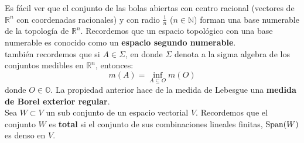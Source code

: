 \documentclass[12pt]{book}
\numberwithin{equation}{chapter}
\def\R{\mathbb{R}}
\begin{document}
Es f\'acil ver que el conjunto de las bolas abiertas con centro racional (vectores de $\R^{n}$ con coordenadas racionales) y con radio $\frac{1}{n}$ ($n \in \mathbb{N}$) forman una base numerable de la topolog\'ia de $\R^{n}$. Recordemos que un espacio topol\'ogico con una base numerable es conocido como un {\bf espacio segundo numerable}. \\
tambi\'en recordemos que si $A \in \Sigma$, en donde $\Sigma$ denota a la sigma algebra de los conjuntos medibles en $\R^{n}$, entonces:
$$ m(A)= \inf_{A \subseteq O} m(O) $$
donde $O \in \mathbb{O} $. La propiedad anterior hace de la medida de Lebesgue una {\bf medida de Borel exterior regular}.\\
Sea $W \subset V$ un sub conjunto de un espacio vectorial $V$. Recordemos que el conjunto $W$ es {\bf total} si el conjunto de sus combinaciones lineales finitas, $\hbox{Span}(W)$ es denso en $V$. 

\vspace{5 mm}
\end{document}
